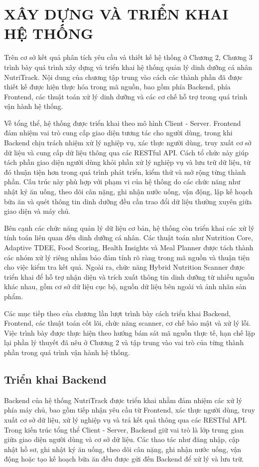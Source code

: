 \documentclass[12pt, a4paper]{report}
\begin{document}
\chapter{XÂY DỰNG VÀ TRIỂN KHAI HỆ THỐNG}
Trên cơ sở kết quả phân tích yêu cầu và thiết kế hệ thống ở Chương 2, Chương 3 trình bày quá trình xây dựng và triển khai hệ thống quản lý dinh dưỡng cá nhân NutriTrack. Nội dung của chương tập trung vào cách các thành phần đã được thiết kế được hiện thực hóa trong mã nguồn, bao gồm phía Backend, phía Frontend, các thuật toán xử lý dinh dưỡng và các cơ chế hỗ trợ trong quá trình vận hành hệ thống.

Về tổng thể, hệ thống được triển khai theo mô hình Client - Server. Frontend đảm nhiệm vai trò cung cấp giao diện tương tác cho người dùng, trong khi Backend chịu trách nhiệm xử lý nghiệp vụ, xác thực người dùng, truy xuất cơ sở dữ liệu và cung cấp dữ liệu thông qua các RESTful API. Cách tổ chức này giúp tách phần giao diện người dùng khỏi phần xử lý nghiệp vụ và lưu trữ dữ liệu, từ đó thuận tiện hơn trong quá trình phát triển, kiểm thử và mở rộng từng thành phần. Cấu trúc này phù hợp với phạm vi của hệ thống do các chức năng như nhật ký ăn uống, theo dõi cân nặng, ghi nhận nước uống, vận động, lập kế hoạch bữa ăn và quét thông tin dinh dưỡng đều cần trao đổi dữ liệu thường xuyên giữa giao diện và máy chủ.

Bên cạnh các chức năng quản lý dữ liệu cơ bản, hệ thống còn triển khai các xử lý tính toán liên quan đến dinh dưỡng cá nhân. Các thuật toán như Nutrition Core, Adaptive TDEE, Food Scoring, Health Insights và Meal Planner được tách thành các nhóm xử lý riêng nhằm bảo đảm tính rõ ràng trong mã nguồn và thuận tiện cho việc kiểm tra kết quả. Ngoài ra, chức năng Hybrid Nutrition Scanner được triển khai để hỗ trợ nhận diện và trích xuất thông tin dinh dưỡng từ nhiều nguồn khác nhau, gồm cơ sở dữ liệu cục bộ, nguồn dữ liệu bên ngoài và ảnh nhãn sản phẩm.

Các mục tiếp theo của chương lần lượt trình bày cách triển khai Backend, Frontend, các thuật toán cốt lõi, chức năng scanner, cơ chế bảo mật và xử lý lỗi. Việc trình bày được thực hiện theo hướng bám sát mã nguồn thực tế, hạn chế lặp lại phần lý thuyết đã nêu ở Chương 2 và tập trung vào vai trò của từng thành phần trong quá trình vận hành hệ thống.

\section{Triển khai Backend}Backend của hệ thống NutriTrack được triển khai nhằm đảm nhiệm các xử lý phía máy chủ, bao gồm tiếp nhận yêu cầu từ Frontend, xác thực người dùng, truy xuất cơ sở dữ liệu, xử lý nghiệp vụ và trả kết quả thông qua các RESTful API. Trong kiến trúc tổng thể Client - Server, Backend giữ vai trò là lớp trung gian giữa giao diện người dùng và cơ sở dữ liệu. Các thao tác như đăng nhập, cập nhật hồ sơ, ghi nhật ký ăn uống, theo dõi cân nặng, ghi nhận nước uống, vận động hoặc tạo kế hoạch bữa ăn đều được gửi đến Backend để xử lý và lưu trữ.
\end{document}
